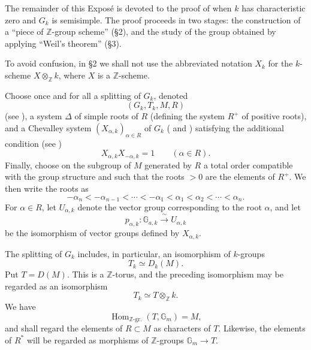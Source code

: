 The remainder of this Exposé is devoted to the proof of  when \(k\) has
characteristic zero and \(G_k\) is semisimple. The proof proceeds in two
stages: the construction of a ``piece of \(\mathbb Z\)-group scheme''
(\S2), and the study of the group obtained by applying ``Weil's theorem''
(\S3).

To avoid confusion, in \S2 we shall not use the abbreviated notation \(X_k\)
for the \(k\)-scheme \(X\otimes_{\mathbb Z}k\), where \(X\) is a
\(\mathbb Z\)-scheme.





Choose once and for all a splitting of \(G_k\), denoted
\[
  (G_k,T_k,M,R)
\]
(see ), a system \(\Delta\) of simple roots of \(R\)
(defining the system \(R^+\) of positive roots), and a Chevalley system
\((X_{\alpha,k})_{\alpha\in R}\) of \(G_k\) ( and )
satisfying the additional condition (see )
\[
  X_{\alpha,k}X_{-\alpha,k}=1\qquad(\alpha\in R).
\]
Finally, choose on the subgroup of \(M\) generated by \(R\) a total order
compatible with the group structure and such that the roots \(>0\) are the
elements of \(R^+\). We then write the roots as
\[
 -\alpha_n<-\alpha_{n-1}<\cdots<-\alpha_1
 <\alpha_1<\alpha_2<\cdots<\alpha_n.
\]
For \(\alpha\in R\), let \(U_{\alpha,k}\) denote the vector group
corresponding to the root \(\alpha\), and let
\[
 p_{\alpha,k}\colon\mathbb G_{a,k}\xrightarrow{\ \sim\ }U_{\alpha,k}
\]
be the isomorphism of vector groups defined by \(X_{\alpha,k}\).


The splitting of \(G_k\) includes, in particular, an isomorphism of
\(k\)-groups
\[
 T_k\simeq D_k(M).
\]
Put \(T=D(M)\). This is a \(\mathbb Z\)-torus, and the preceding isomorphism
may be regarded as an isomorphism
\[
 T_k\simeq T\otimes_{\mathbb Z}k.
\]
We have
\[
 \operatorname{Hom}_{\mathbb Z\text{-gr.}}(T,\mathbb G_m)=M,
\]
and shall regard the elements of \(R\subset M\) as characters of \(T\).
Likewise, the elements of \(R^\ast\) will be regarded as morphisms of
\(\mathbb Z\)-groups \(\mathbb G_m\to T\).

